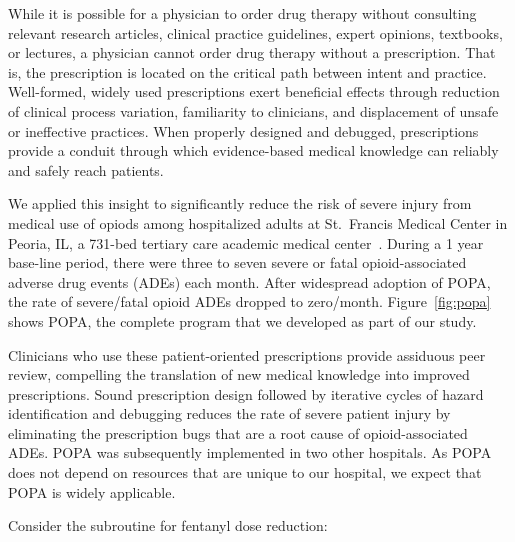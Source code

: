 While it is possible for a physician to order drug therapy without
consulting relevant research articles, clinical practice guidelines,
expert opinions, textbooks, or lectures, a physician cannot order drug
therapy without a prescription. That is, the prescription is located
on the critical path between intent and practice. Well-formed, widely
used prescriptions exert beneficial effects through reduction of
clinical process variation, familiarity to clinicians, and
displacement of unsafe or ineffective practices. When properly
designed and debugged, prescriptions provide a conduit through which
evidence-based medical knowledge can reliably and safely reach patients.

We applied this insight to significantly reduce the risk of severe injury from medical use of opiods among hospitalized adults at St.\ Francis Medical
Center in Peoria, IL, a 731-bed tertiary care academic medical
center~\citep{Belknap2008}. During a 1 year base-line period, there were three to seven severe or fatal opioid-associated adverse drug events (ADEs) each month. After widespread adoption of POPA, the rate of severe/fatal opioid ADEs dropped to zero/month. Figure~\ref{fig:popa} shows POPA, the
complete program that we developed as part of our study.

Clinicians who use these patient-oriented prescriptions provide assiduous peer review, compelling the translation of new medical knowledge into improved
prescriptions. Sound prescription design followed by iterative cycles of hazard identification and debugging reduces the rate of severe patient injury by eliminating the prescription bugs that are a root cause of opioid-associated ADEs. POPA was subsequently implemented in two other hospitals. As POPA does not depend on resources that are unique to our hospital, we
expect that POPA is widely applicable.

Consider the subroutine for fentanyl dose reduction:
\begin{center}
\end{center}

